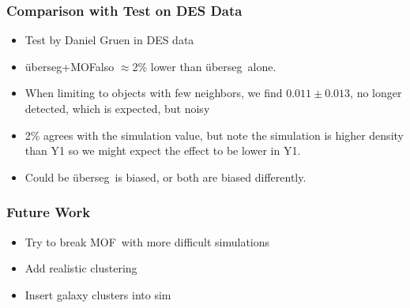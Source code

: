 \documentclass{beamer}
\newcommand{\uberseg}{{\color{lightsteelblue} {\"u}berseg}}
\newcommand{\MOF}{{\color{brightred}MOF}}
\begin{document}
\frame
{

    \frametitle{Comparison with Test on DES Data}


    \begin{itemize}

        \item Test by Daniel Gruen in DES data

        \item \uberseg+\MOF also $\approx$2\% lower than \uberseg\ alone.

        \item When limiting to objects with few neighbors, we find $0.011 \pm 0.013$,
            no longer detected, which is expected, but noisy

        \item 2\% agrees with the simulation value, but note the
            simulation is higher density than Y1 so we might expect the effect
            to be lower in Y1.

        \item Could be \uberseg\ is biased, or both are biased differently.


    \end{itemize}


}





\frame
{
    \frametitle{Future Work}

    \begin{itemize}

        \item Try to break \MOF\ with more difficult simulations

        \item Add realistic clustering

        \item Insert galaxy clusters into sim


    \end{itemize}
}
\end{document}

